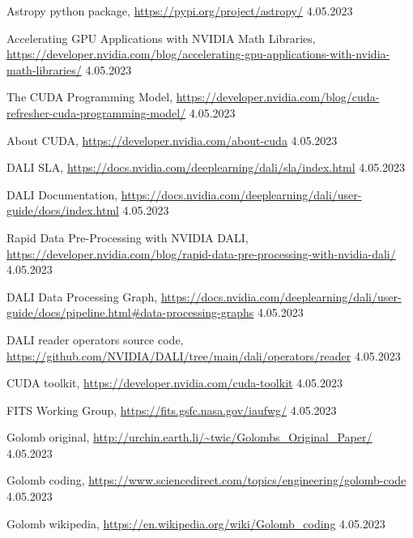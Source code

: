\documentclass[licencjacka,en]{pracamgr}
\begin{document}
\begin{thebibliography}{99}
         {Astropy python package},
        \url{https://pypi.org/project/astropy/} 4.05.2023

         {Accelerating GPU Applications with NVIDIA Math Libraries},
        \url{https://developer.nvidia.com/blog/accelerating-gpu-applications-with-nvidia-math-libraries/} 4.05.2023

         {The CUDA Programming Model},
        \url{https://developer.nvidia.com/blog/cuda-refresher-cuda-programming-model/} 4.05.2023

         {About CUDA},
        \url{https://developer.nvidia.com/about-cuda} 4.05.2023

         {DALI SLA},
        \url{https://docs.nvidia.com/deeplearning/dali/sla/index.html} 4.05.2023

         {DALI Documentation},
        \url{https://docs.nvidia.com/deeplearning/dali/user-guide/docs/index.html} 4.05.2023

         {Rapid Data Pre-Processing with NVIDIA DALI},
        \url{https://developer.nvidia.com/blog/rapid-data-pre-processing-with-nvidia-dali/} 4.05.2023

         {DALI Data Processing Graph},
        \url{https://docs.nvidia.com/deeplearning/dali/user-guide/docs/pipeline.html#data-processing-graphs} 4.05.2023 

         {DALI reader operators source code},
        \url{https://github.com/NVIDIA/DALI/tree/main/dali/operators/reader} 4.05.2023

         {CUDA toolkit},
        \url{https://developer.nvidia.com/cuda-toolkit} 4.05.2023

         {FITS Working Group},
        \url{https://fits.gsfc.nasa.gov/iaufwg/} 4.05.2023

         {Golomb original},
        \url{http://urchin.earth.li/~twic/Golombs_Original_Paper/} 4.05.2023

         {Golomb coding},
        \url{https://www.sciencedirect.com/topics/engineering/golomb-code} 4.05.2023

         {Golomb wikipedia},
        \url{https://en.wikipedia.org/wiki/Golomb_coding} 4.05.2023

        


\end{thebibliography}
\end{document}
